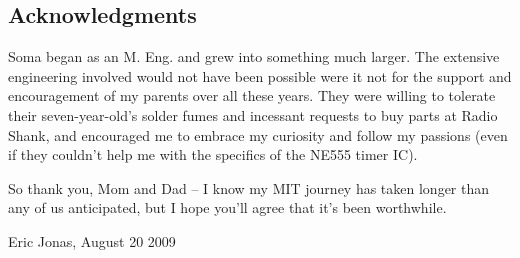 \subsection*{Acknowledgments}

Soma began as an M. Eng. and grew into something much
larger. The extensive engineering involved would not have been
possible were it not for the support and encouragement of my parents
over all these years. They were willing to tolerate their seven-year-old's
solder fumes and incessant requests to buy parts at Radio Shank, and
encouraged me to embrace my curiosity and follow my passions (even
if they couldn't help me with the specifics of the NE555 timer IC). 

So thank you, Mom and Dad -- I know my MIT journey has taken longer
than any of us anticipated, but I hope you'll agree that it's been
worthwhile.

\vspace{0.5in}
Eric Jonas, 
August 20 2009
